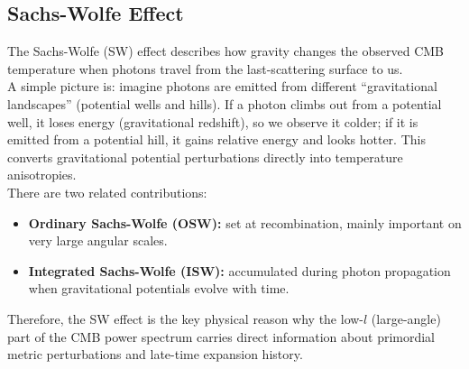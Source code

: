 \clearpage
\subsection{Sachs-Wolfe Effect}
\begin{intuition}
    The Sachs-Wolfe (SW) effect describes how gravity changes the observed CMB temperature when photons travel from the last-scattering surface to us. \\

    A simple picture is: imagine photons are emitted from different ``gravitational landscapes'' (potential wells and hills). If a photon climbs out from a potential well, it loses energy (gravitational redshift), so we observe it colder; if it is emitted from a potential hill, it gains relative energy and looks hotter. This converts gravitational potential perturbations directly into temperature anisotropies. \\

    There are two related contributions:
    \begin{itemize}
        \item \textbf{Ordinary Sachs-Wolfe (OSW):} set at recombination, mainly important on very large angular scales.
        \item \textbf{Integrated Sachs-Wolfe (ISW):} accumulated during photon propagation when gravitational potentials evolve with time.
    \end{itemize}
    Therefore, the SW effect is the key physical reason why the low-$l$ (large-angle) part of the CMB power spectrum carries direct information about primordial metric perturbations and late-time expansion history.
\end{intuition}

